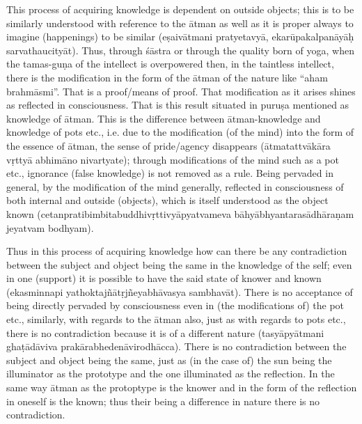 
This process of acquiring knowledge is dependent on outside objects; this is to be similarly understood with reference to the ātman as well as it is proper always to imagine (happenings) to be similar (eṣaivātmani pratyetavyā, ekarūpakalpanāyāḥ sarvathaucityāt). Thus, through śāstra or through the quality born of yoga, when the tamas-guṇa of the intellect is overpowered then, in the taintless intellect, there is the modification in the form of the ātman of the nature like “aham brahmāsmi”. That is a proof/means of proof. That modification as it arises shines as reflected in consciousness. That is this result situated in puruṣa mentioned as knowledge of ātman. This is the difference between ātman-knowledge and knowledge of pots etc., i.e. due to the modification (of the mind) into the form of the essence of ātman, the sense of pride/agency disappears (ātmatattvākāra vṛttyā abhimāno nivartyate); through modifications of the mind such as a pot etc., ignorance (false knowledge) is not removed as a rule. Being pervaded in general, by the modification of the mind generally, reflected in consciousness of both internal and outside (objects), which is itself understood as the object known (cetanpratibimbitabuddhivṛttivyāpyatvameva bāhyābhyantarasādhāraṇam jeyatvam bodhyam). 

Thus in this process of acquiring knowledge how can there be any contradiction between the subject and object being the same in the knowledge of the self;  even in one (support) it is possible to have the said state of knower and known (ekasminnapi yathoktajñātṛjñeyabhāvasya sambhavāt). There is no acceptance of being directly pervaded by consciousness even in (the modifications of) the pot etc., similarly, with regards to the ātman also, just as with regards to pots etc., there is no contradiction because it is of a different nature (tasyāpyātmani ghaṭādāviva prakārabhedenāvirodhācca). There is no contradiction between the subject and object being the same, just as (in the case of) the sun being the illuminator as the prototype and   the one illuminated as the reflection. In the same way ātman as the protoptype is the knower and in the form of the reflection in oneself is the known; thus their being a difference in nature there is no contradiction.

